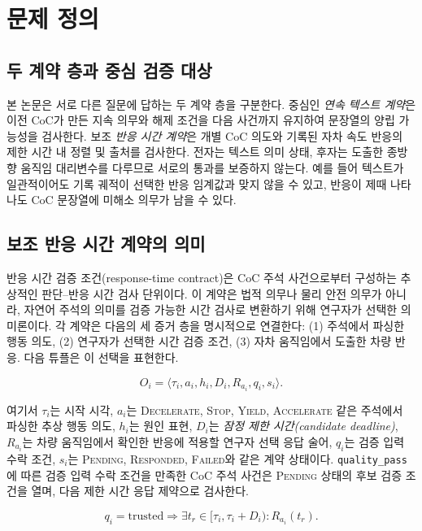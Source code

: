 \section{문제 정의}
\label{sec:problem}

\subsection{두 계약 층과 중심 검증 대상}
본 논문은 서로 다른 질문에 답하는 두 계약 층을 구분한다. 중심인 \emph{연속 텍스트 계약}은 이전 CoC가 만든 지속 의무와 해제 조건을 다음 사건까지 유지하여 문장열의 양립 가능성을 검사한다. 보조 \emph{반응 시간 계약}은 개별 CoC 의도와 기록된 자차 속도 반응의 제한 시간 내 정렬 및 출처를 검사한다. 전자는 텍스트 의미 상태, 후자는 도출한 종방향 움직임 대리변수를 다루므로 서로의 통과를 보증하지 않는다. 예를 들어 텍스트가 일관적이어도 기록 궤적이 선택한 반응 임계값과 맞지 않을 수 있고, 반응이 제때 나타나도 CoC 문장열에 미해소 의무가 남을 수 있다.

\subsection{보조 반응 시간 계약의 의미}
반응 시간 검증 조건(response-time contract)은 CoC 주석 사건으로부터 구성하는 추상적인 판단--반응 시간 검사 단위이다. 이 계약은 법적 의무나 물리 안전 의무가 아니라, 자연어 주석의 의미를 검증 가능한 시간 검사로 변환하기 위해 연구자가 선택한 의미론이다. 각 계약은 다음의 세 증거 층을 명시적으로 연결한다: (1) 주석에서 파싱한 행동 의도, (2) 연구자가 선택한 시간 검증 조건, (3) 자차 움직임에서 도출한 차량 반응. 다음 튜플은 이 선택을 표현한다.

\begin{equation}
O_i = \langle \tau_i, a_i, h_i, D_i, R_{a_i}, q_i, s_i \rangle .
\end{equation}

여기서 $\tau_i$는 시작 시각, $a_i$는 \textsc{Decelerate}, \textsc{Stop}, \textsc{Yield}, \textsc{Accelerate} 같은 주석에서 파싱한 추상 행동 의도, $h_i$는 원인 표현, $D_i$는 \emph{잠정 제한 시간(candidate deadline)}, $R_{a_i}$는 차량 움직임에서 확인한 반응에 적용할 연구자 선택 응답 술어, $q_i$는 검증 입력 수락 조건, $s_i$는 \textsc{Pending}, \textsc{Responded}, \textsc{Failed}와 같은 계약 상태이다. \texttt{quality\_pass}에 따른 검증 입력 수락 조건을 만족한 CoC 주석 사건은 \textsc{Pending} 상태의 후보 검증 조건을 열며, 다음 제한 시간 응답 제약으로 검사한다.

\begin{equation}
q_i=\mathrm{trusted}
\Rightarrow
\exists t_r \in [\tau_i,\tau_i + D_i) :
R_{a_i}(t_r).
\label{eq:obligation-contract}
\end{equation}

